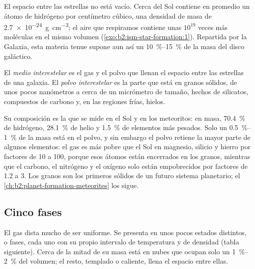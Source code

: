 El espacio entre las estrellas no está vacío. Cerca del Sol contiene en promedio
un átomo de hidrógeno por centímetro cúbico, una densidad de masa de
\qty{2.7e-24}{g.cm^{-3}}; el aire que respiramos contiene unas $10^{19}$ veces
más moléculas en el mismo volumen (\cref{exo:b2:ism-star-formation:1}). Repartida por la Galaxia, esta materia tenue
supone aun así un \qtyrange{10}{15}{\percent} de la masa del
disco galáctico.

\begin{definition}
\label{def:b2:ism-star-formation:ism}
El \emph{medio interestelar} es el gas y el polvo
que llenan el espacio entre las estrellas de una galaxia. El \emph{polvo
interestelar} es la parte que está en granos sólidos, de unos
pocos nanómetros a cerca de un micrómetro de tamaño, hechos de silicatos, compuestos
de carbono y, en las regiones frías, hielos.
\end{definition}

Su composición es la que se mide en el Sol y en los meteoritos: en masa,
\qty{70.4}{\percent} de hidrógeno, \qty{28.1}{\percent} de helio y
\qty{1.5}{\percent} de elementos más pesados. Solo un \qtyrange{0.5}{1}{\percent} de la
masa está en el polvo, y sin embargo el polvo retiene la mayor parte de algunos elementos: el gas es
más pobre que el Sol en magnesio, silicio y hierro por factores de 10 a 100, porque
esos átomos están encerrados en los granos, mientras que el carbono, el nitrógeno y el oxígeno
solo están empobrecidos por factores de 1.2 a 3. Los granos son los primeros sólidos de un
futuro sistema planetario; el \cref{ch:b2:planet-formation-meteorites}
los sigue.

\subsection{Cinco fases}

El gas dista mucho de ser uniforme. Se presenta en unos pocos estados distintos, o fases,
cada uno con su propio intervalo de temperatura y de densidad (tabla siguiente). Cerca de la mitad
de su masa está en nubes que ocupan solo un \qtyrange{1}{2}{\percent} del volumen;
el resto, templado o caliente, llena el espacio entre ellas.

